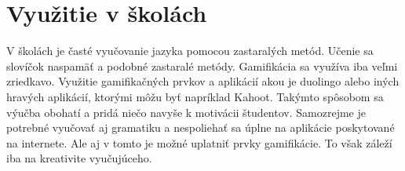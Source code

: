 \documentclass[10pt,oneside,slovak,a4paper]{article}
\begin{document}
\section{Využitie v školách}
V školách je časté vyučovanie jazyka pomocou zastaralých metód. Učenie sa slovíčok naspamäť a podobné zastaralé metódy. Gamifikácia sa využíva iba veľmi zriedkavo. Využitie gamifikačných prvkov a aplikácií akou je duolingo alebo iných hravých aplikácií, ktorými môžu byť napríklad Kahoot. Takýmto spôsobom sa výučba obohatí a pridá niečo navyše k motivácii študentov. Samozrejme je potrebné vyučovať aj gramatiku a nespoliehať sa úplne na aplikácie poskytované na internete. Ale aj v tomto je možné uplatniť prvky gamifikácie. To však záleží iba na kreativite vyučujúceho.




\end{document}
